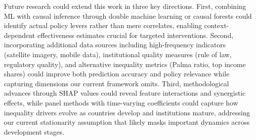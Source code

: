 \documentclass[10pt,twocolumn]{article}
\begin{document}
\par Future research could extend this work in three key directions. First, combining ML with causal inference through double machine learning or causal forests could identify actual policy levers rather than mere correlates, enabling context-dependent effectiveness estimates crucial for targeted interventions. Second, incorporating additional data sources including high-frequency indicators (satellite imagery, mobile data), institutional quality measures (rule of law, regulatory quality), and alternative inequality metrics (Palma ratio, top income shares) could improve both prediction accuracy and policy relevance while capturing dimensions our current framework omits. Third, methodological advances through SHAP values could reveal feature interactions and synergistic effects, while panel methods with time-varying coefficients could capture how inequality drivers evolve as countries develop and institutions mature, addressing our current stationarity assumption that likely masks important dynamics across development stages.
\end{document}
